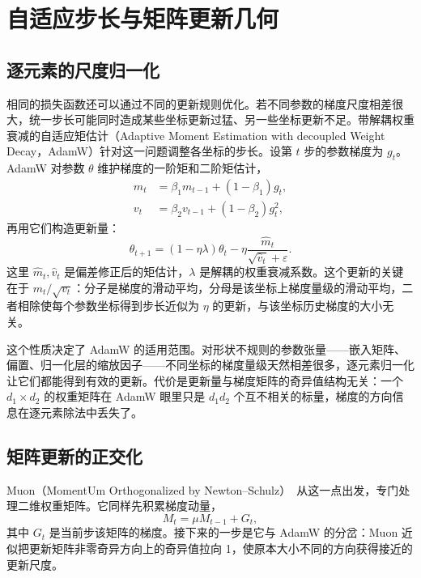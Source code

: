 \section{自适应步长与矩阵更新几何}

\subsection{逐元素的尺度归一化}

相同的损失函数还可以通过不同的更新规则优化。若不同参数的梯度尺度相差很大，统一步长可能同时造成某些坐标更新过猛、另一些坐标更新不足。带解耦权重衰减的自适应矩估计（Adaptive Moment Estimation with decoupled Weight Decay，AdamW）针对这一问题调整各坐标的步长。设第 \(t\) 步的参数梯度为 \(g_t\)。AdamW 对参数 \(\theta\) 维护梯度的一阶矩和二阶矩估计，
\begin{align}
 m_t&=\beta_1m_{t-1}+(1-\beta_1)g_t,\\
 v_t&=\beta_2v_{t-1}+(1-\beta_2)g_t^2,
\end{align}
再用它们构造更新量：
\begin{equation}
 \theta_{t+1}=(1-\eta\lambda)\theta_t
 -\eta\frac{\widehat m_t}{\sqrt{\widehat v_t}+\varepsilon}.
\end{equation}
这里 \(\widehat m_t,\widehat v_t\) 是偏差修正后的矩估计，\(\lambda\) 是解耦的权重衰减系数。这个更新的关键在于 \(m_t/\sqrt{v_t}\)：分子是梯度的滑动平均，分母是该坐标上梯度量级的滑动平均，二者相除使每个参数坐标得到步长近似为 \(\eta\) 的更新，与该坐标历史梯度的大小无关。

这个性质决定了 AdamW 的适用范围。对形状不规则的参数张量——嵌入矩阵、偏置、归一化层的缩放因子——不同坐标的梯度量级天然相差很多，逐元素归一化让它们都能得到有效的更新。代价是更新量与梯度矩阵的奇异值结构无关：一个 \(d_1\times d_2\) 的权重矩阵在 AdamW 眼里只是 \(d_1d_2\) 个互不相关的标量，梯度的方向信息在逐元素除法中丢失了。

\subsection{矩阵更新的正交化}

Muon（MomentUm Orthogonalized by Newton--Schulz）~\cite{jordan2024muon}从这一点出发，专门处理二维权重矩阵。它同样先积累梯度动量，
\begin{equation}
 M_t=\mu M_{t-1}+G_t,
\end{equation}
其中 \(G_t\) 是当前步该矩阵的梯度。接下来的一步是它与 AdamW 的分岔：Muon 近似把更新矩阵非零奇异方向上的奇异值拉向 1，使原本大小不同的方向获得接近的更新尺度。

